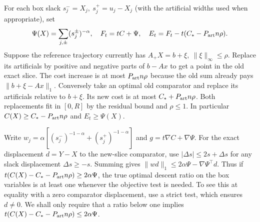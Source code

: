 \documentclass[11pt]{article}
\begin{document}
For each box slack \(s_j^-=X_j,\ s_j^+=u_j-X_j\) (with the artificial widths used when appropriate), set
\[
 \Psi(X)=\sum_{j,\pm}(s_j^\pm)^{-\alpha},\quad
 F_t=tC+\Psi,\quad E_t=F_t-t(C_*-P_{\rm art}n\rho).
\]
Suppose the reference trajectory currently has \(A_+X=b+\xi,\ \|\xi\|_\infty\le\rho\). Replace its artificials by positive and negative parts of \(b-Ax\) to get a point in the old exact slice. The cost increase is at most \(P_{\rm art}n\rho\) because the old sum already pays \(\|b+\xi-Ax\|_1\). Conversely take an optimal old comparator and replace its artificials relative to \(b+\xi\). Its new cost is at most \(C_*+P_{\rm art}n\rho\). Both replacements fit in \([0,R]\) by the residual bound and \(\rho\le1\). In particular \(C(X)\ge C_*-P_{\rm art}n\rho\) and \(E_t\ge\Psi(X)\).

Write \(w_j=\alpha[(s_j^-)^{-1-\alpha}+(s_j^+)^{-1-\alpha}]\) and \(g=t\nabla C+\nabla\Psi\). For the exact displacement \(d=Y-X\) to the new-slice comparator, use \(|\Delta s|\le2s+\Delta s\) for any slack displacement \(\Delta s\ge-s\). Summing gives \(\|w d\|_1\le2\alpha\Psi-\nabla\Psi^\top d\). Thus if \(t(C(X)-C_*-P_{\rm art}n\rho)\ge2\alpha\Psi\), the true optimal descent ratio on the box variables is at least one whenever the objective test is needed. To see this at equality with a zero comparator displacement, use a strict test, which ensures \(d\ne0\). We shall only require that a ratio below one implies \(t(C(X)-C_*-P_{\rm art}n\rho)\le2\alpha\Psi\).
\end{document}
